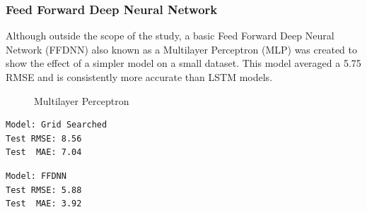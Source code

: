 ﻿\documentclass[10pt,11pt,12pt,oneside]{book}
\begin{document}
\subsubsection{Feed Forward Deep Neural Network}
Although outside the scope of the study, a basic Feed Forward Deep Neural Network (FFDNN) also known as a Multilayer Perceptron (MLP) was created to show the effect of a simpler model on a small dataset. This model averaged a 5.75 RMSE and is consistently more accurate than LSTM models. \\
\begin{figure}[H]
    \centering
    \qquad
    \caption{Multilayer Perceptron}%
    \label{fig:mlp}%
\end{figure}
\begin{multicols}{2}
\centering
\begin{verbatim}
Model: Grid Searched
Test RMSE: 8.56
Test  MAE: 7.04
\end{verbatim}
\begin{verbatim}
Model: FFDNN
Test RMSE: 5.88
Test  MAE: 3.92
\end{verbatim}
\end{multicols}
\end{document}

